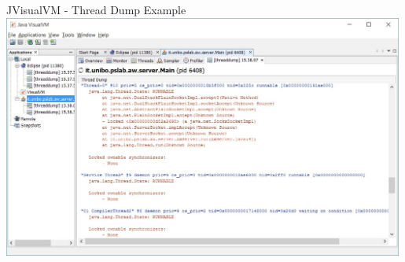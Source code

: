 \documentclass[presentation]{beamer}
\begin{document}
\begin{frame}{JVisualVM - Thread Dump Example}
\centering
\includegraphics[width=0.99\textwidth]{img/jvisualvm-3}
\end{frame}
\end{document}
